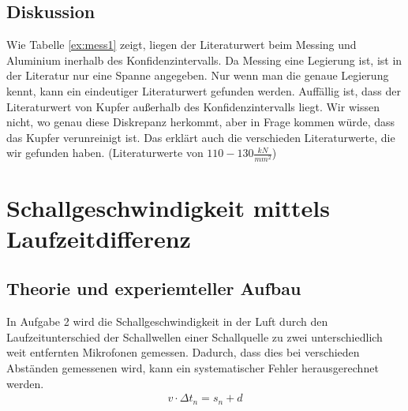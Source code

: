 \documentclass[11pt, a4paper]{article}
\begin{document}
    \subsection{Diskussion}
    Wie Tabelle \ref{ex:mess1} zeigt, liegen der Literaturwert beim Messing und Aluminium inerhalb des Konfidenzintervalls.
    Da Messing eine Legierung ist, ist in der Literatur nur eine Spanne angegeben. Nur wenn man die genaue Legierung kennt,
    kann ein eindeutiger Literaturwert gefunden werden.
    Auffällig ist, dass der Literaturwert von Kupfer außerhalb des Konfidenzintervalls liegt. Wir wissen nicht,
    wo genau diese Diskrepanz herkommt, aber in Frage kommen würde, dass das Kupfer verunreinigt ist. Das erklärt auch 
    die verschieden Literaturwerte, die wir gefunden haben. (Literaturwerte von $110-130\frac{kN}{mm^2}$)

    \section{Schallgeschwindigkeit mittels Laufzeitdifferenz}

    \subsection{Theorie und experiemteller Aufbau}
    In Aufgabe 2 wird die Schallgeschwindigkeit in der Luft durch den Laufzeitunterschied der Schallwellen einer Schallquelle zu zwei unterschiedlich
    weit entfernten Mikrofonen gemessen. Dadurch, dass dies bei verschieden Abständen gemessenen wird, kann ein systematischer
    Fehler herausgerechnet werden.
    \begin{align}
        v \cdot \Delta t_n = s_n + d
    \end{align}
\end{document}
